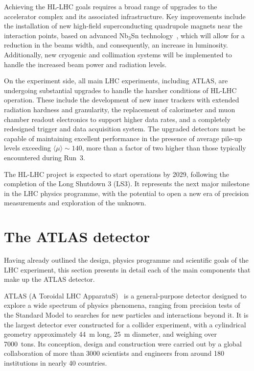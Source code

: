 Achieving the HL-LHC goals requires a broad range of upgrades to the accelerator complex and its associated infrastructure. Key improvements include the installation of new high-field superconducting quadrupole magnets near the interaction points, based on advanced Nb$_3$Sn technology~\cite{Mangiarotti:2770766}, which will allow for a reduction in the beams width, and consequently, an increase in luminosity. Additionally, new cryogenic and collimation systems will be implemented to handle the increased beam power and radiation levels.

On the experiment side, all main LHC experiments, including ATLAS, are undergoing substantial upgrades to handle the harsher conditions of HL-LHC operation. These include the development of new inner trackers with extended radiation hardness and granularity, the replacement of calorimeter and muon chamber readout electronics to support higher data rates, and a completely redesigned trigger and data acquisition system. The upgraded detectors must be capable of maintaining excellent performance in the presence of average pile-up levels exceeding $\langle\mu\rangle \sim 140$, more than a factor of two higher than those typically encountered during Run~3.

The HL-LHC project is expected to start operations by 2029, following the completion of the Long Shutdown 3 (LS3). It represents the next major milestone in the LHC physics programme, with the potential to open a new era of precision measurements and exploration of the unknown.


\section{The ATLAS detector}
\label{sec:ATLAS}

Having already outlined the design, physics programme and scientific goals of the LHC experiment, this section presents in detail each of the main components that make up the ATLAS detector.

ATLAS (A Toroidal LHC ApparatuS)~\cite{ATLAS:exp,ATLAS:1999uwa} is a general-purpose detector designed to explore a wide spectrum of physics phenomena, ranging from precision tests of the Standard Model to searches for new particles and interactions beyond it. It is the largest 
detector ever constructed for a collider experiment, with a cylindrical geometry approximately 44~m long, 25~m diameter, and weighing over 7000~tons. Its conception, design and construction were carried out by a global collaboration of more than 3000 scientists and engineers from around 180 institutions in nearly 40 countries.

